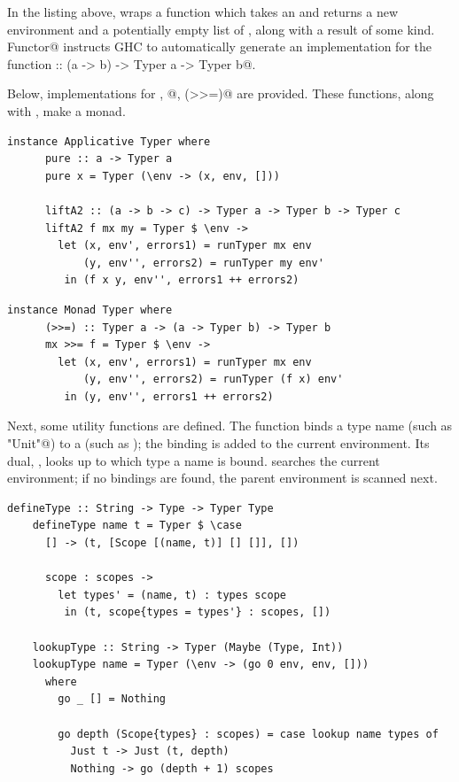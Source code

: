 \documentclass[UdineBachThesis,american,11pt]{PhdThesis}
\begin{document}
  In the listing above, \lstinline@Typer@ wraps a function which takes an
  \lstinline@Environment@ and returns a new environment and a potentially empty
  list of \lstinline@Error@s, along with a result of some kind.
  \lstinline@deriving Functor@ instructs GHC to automatically generate an
  implementation for the function
  \lstinline@fmap :: (a -> b) -> Typer a -> Typer b@.

  Below, implementations for \lstinline@pure@, @,
  \lstinline@(>>=)@ are provided. These functions, along with \lstinline@fmap@,
  make \lstinline@Typer@ a monad.

  \begin{lstlisting}[gobble=4,basicstyle=\ttfamily\small]
    instance Applicative Typer where
      pure :: a -> Typer a
      pure x = Typer (\env -> (x, env, []))

      liftA2 :: (a -> b -> c) -> Typer a -> Typer b -> Typer c
      liftA2 f mx my = Typer $ \env ->
        let (x, env', errors1) = runTyper mx env
            (y, env'', errors2) = runTyper my env'
         in (f x y, env'', errors1 ++ errors2)
  \end{lstlisting}

  \newpage

  \begin{lstlisting}[gobble=4,basicstyle=\ttfamily\small]
    instance Monad Typer where
      (>>=) :: Typer a -> (a -> Typer b) -> Typer b
      mx >>= f = Typer $ \env ->
        let (x, env', errors1) = runTyper mx env
            (y, env'', errors2) = runTyper (f x) env'
         in (y, env'', errors1 ++ errors2)
  \end{lstlisting}

  Next, some utility functions are defined. The function \lstinline@defineType@
  binds a type name (such as \lstinline@"Unit"@) to a \lstinline@Type@ (such as
  \lstinline@Unit@); the binding is added to the current environment. Its dual,
  \lstinline@lookupType@, looks up to which type a name is bound.
  \lstinline@lookupType@ searches the current environment; if no bindings are
  found, the parent environment is scanned next.

  \begin{lstlisting}[gobble=4,basicstyle=\ttfamily\small]
    defineType :: String -> Type -> Typer Type
    defineType name t = Typer $ \case
      [] -> (t, [Scope [(name, t)] [] []], [])

      scope : scopes ->
        let types' = (name, t) : types scope
         in (t, scope{types = types'} : scopes, [])

    lookupType :: String -> Typer (Maybe (Type, Int))
    lookupType name = Typer (\env -> (go 0 env, env, []))
      where
        go _ [] = Nothing

        go depth (Scope{types} : scopes) = case lookup name types of
          Just t -> Just (t, depth)
          Nothing -> go (depth + 1) scopes
  \end{lstlisting}
\end{document}
